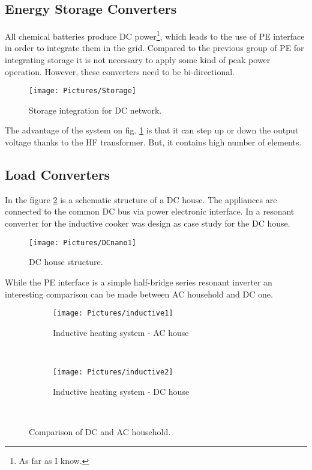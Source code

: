 \documentclass[]{scrartcl}
\begin{document}
\subsection{Energy Storage Converters}
All chemical batteries produce DC power\footnote{As far as I know.}, which leads to the use of PE interface in order to integrate them in the grid. Compared to the previous group of PE for integrating storage it is not necessary to apply some kind of peak power operation. However, these converters need to be bi-directional.

\begin{figure}[h!]
	\centering
	\texttt{[image: Pictures/Storage]}
	\caption{Storage integration for DC network.}
	\label{fig:Storage}
\end{figure}

The advantage of the system on fig. \ref{fig:Storage} is that it can step up or down the output voltage thanks to the HF transformer. But, it contains high number of elements.


\subsection{Load Converters}

In the figure \ref{fig:DCnano1} is a schematic structure of a DC house. The appliances are connected to the common DC bus via power electronic interface. In \cite{Lucia2013} a resonant converter for the inductive cooker was design as case study for the DC house.
\begin{figure}[h!]
	\centering
	\texttt{[image: Pictures/DCnano1]}
	\caption{DC house structure.\cite{Lucia2013}}
	\label{fig:DCnano1}
\end{figure}
\newpage


While the PE interface is a simple half-bridge series resonant inverter an interesting comparison can be made between AC household and DC one. 

\begin{figure}[h!]
	\centering
	\begin{subfigure}[b]{0.45\textwidth}
		\texttt{[image: Pictures/inductive1]}
		\caption{Inductive heating system - AC house \cite{Lucia2013}}
		\label{fig:inductive1}
	\end{subfigure}
	~ %
	\begin{subfigure}[b]{0.45\textwidth}
		\texttt{[image: Pictures/inductive2]}
		\caption{Inductive heating system - DC house \cite{Lucia2013}}
		\label{fig:inductive2}
	\end{subfigure}
	~ %
	
	\caption{Comparison of DC and AC household.}\label{fig:DCAC}
\end{figure}
\end{document}
